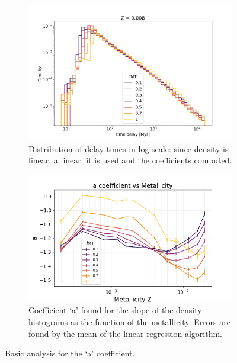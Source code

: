 \documentclass[preprint,12pt]{elsarticle}
\begin{document}
\begin{figure}[htp]
    \begin{subfigure}[t]{0.50\textwidth}
      \centering
      \includegraphics[width=1\textwidth]{Images/delaytimes_Z0.008.png}
      \caption{Distribution of delay times in log scale: since density is linear, a linear fit is used and the coefficients computed.}
      \label{img:delaytimes}
    \end{subfigure}
    \hfill
    \begin{subfigure}[t]{0.50\textwidth}
      \centering
      \includegraphics[width=1\textwidth]{Images/a_vs_Z.png}
      \caption{Coefficient `a' found for the slope of the density histograms as the function of the metallicity. Errors are found by the mean of the linear regression algorithm.}
      \label{img:a_vs_Z}
    \end{subfigure}
    \caption{Basic analysis for the `a' coefficient.}
    \label{img:a_coefficient_first}
  \end{figure}
\end{document}
